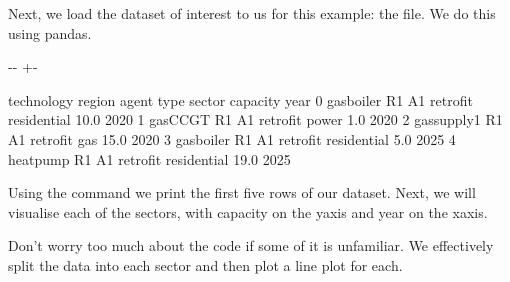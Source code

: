 \documentclass[letterpaper,10pt,english]{sphinxmanual}
\newlength\nbsphinxcodecellspacing
\begin{document}
Next, we load the dataset of interest to us for this example: the  file. We do this using pandas.

{
\begin{sphinxVerbatim}[commandchars=\\\{\}]
\llap{\color{nbsphinxin}[2]:\,\hspace{\fboxrule}\hspace{\fboxsep}}  
\end{sphinxVerbatim}
}

{

\kern-\sphinxverbatimsmallskipamount\kern-\baselineskip
\kern+\FrameHeightAdjust\kern-\fboxrule
\vspace{\nbsphinxcodecellspacing}

\begin{sphinxVerbatim}[commandchars=\\\{\}]
\llap{\color{nbsphinxout}[2]:\,\hspace{\fboxrule}\hspace{\fboxsep}}   technology region agent      type       sector  capacity  year
0   gasboiler     R1    A1  retrofit  residential      10.0  2020
1     gasCCGT     R1    A1  retrofit        power       1.0  2020
2  gassupply1     R1    A1  retrofit          gas      15.0  2020
3   gasboiler     R1    A1  retrofit  residential       5.0  2025
4    heatpump     R1    A1  retrofit  residential      19.0  2025
\end{sphinxVerbatim}
}

Using the  command we print the first five rows of our dataset. Next, we will visualise each of the sectors, with capacity on the y\sphinxhyphen{}axis and year on the x\sphinxhyphen{}axis.

Don’t worry too much about the code if some of it is unfamiliar. We effectively split the data into each sector and then plot a line plot for each.
\end{document}
